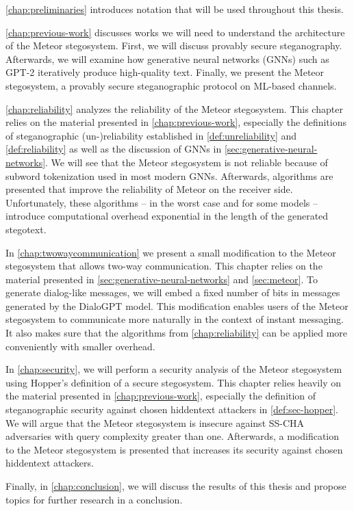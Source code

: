 \autoref{chap:preliminaries} introduces notation that will be used throughout this thesis.

\autoref{chap:previous-work} discusses works we will need to understand the architecture of the Meteor stegosystem.
First, we will discuss provably secure steganography.
Afterwards, we will examine how generative neural networks (GNNs) such as GPT-2 iteratively produce high-quality text.
Finally, we present the Meteor stegosystem, a provably secure steganographic protocol on ML-based channels.

\autoref{chap:reliability} analyzes the reliability of the Meteor stegosystem. 
This chapter relies on the material presented in \autoref{chap:previous-work}, especially the definitions of steganographic (un-)reliability established in \autoref{def:unreliability} and \autoref{def:reliability} as well as the discussion of GNNs in \autoref{sec:generative-neural-networks}.
We will see that the Meteor stegosystem is not reliable because of subword tokenization used in most modern GNNs.
Afterwards, algorithms are presented that improve the reliability of Meteor on the receiver side.
Unfortunately, these algorithms -- in the worst case and for some models -- introduce computational overhead exponential in the length of the generated stegotext.

In \autoref{chap:twowaycommunication} we present a small modification to the Meteor stegosystem that allows two-way communication.
This chapter relies on the material presented in \autoref{sec:generative-neural-networks} and \autoref{sec:meteor}.
To generate dialog-like messages, we will embed a fixed number of bits in messages generated by the DialoGPT model.
This modification enables users of the Meteor stegosystem to communicate more naturally in the context of instant messaging.
It also makes sure that the algorithms from \autoref{chap:reliability} can be applied more conveniently with smaller overhead.

In \autoref{chap:security}, we will perform a security analysis of the Meteor stegosystem using Hopper's definition of a secure stegosystem.
This chapter relies heavily on the material presented in \autoref{chap:previous-work}, especially the definition of steganographic security against chosen hiddentext attackers in \autoref{def:sec-hopper}.
We will argue that the Meteor stegosystem is insecure against SS-CHA adversaries with query complexity greater than one.
Afterwards, a modification to the Meteor stegosystem is presented that increases its security against chosen hiddentext attackers.

Finally, in \autoref{chap:conclusion}, we will discuss the results of this thesis and propose topics for further research in a conclusion.